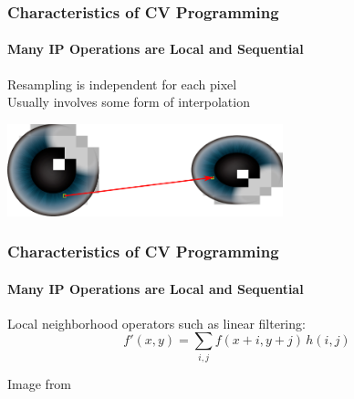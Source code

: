 \documentclass[xetex,professionalfont]{beamer}
\begin{document}

\begin{frame}
\frametitle{Characteristics of CV Programming}
\framesubtitle{Many IP Operations are Local and Sequential}

Resampling is independent for each pixel\\
Usually involves some form of interpolation

\bigskip
\begin{center}
	\includegraphics[width=8cm]{figures/resampling.png}
\end{center}

\end{frame}


\begin{frame}
\frametitle{Characteristics of CV Programming}
\framesubtitle{Many IP Operations are Local and Sequential}

Local neighborhood operators such as linear filtering:
\[
 f'(x,y)=\sum_{i,j}f(x+i,y+j)\,h(i,j)
\]

\medskip
\begin{center}
	{\centering Image from \cite{prince12}}
\end{center}

\end{frame}

\end{document}
